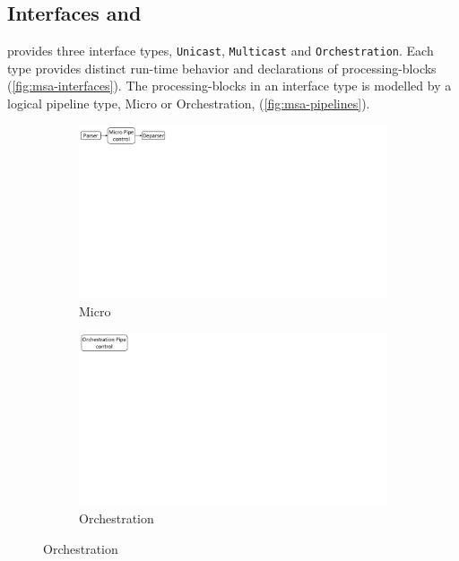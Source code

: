\documentclass[letterpaper,twocolumn,10pt]{article}
\begin{document}
\subsection{Interfaces and \upipelines}
\label{sec:pipelines}
\uarch provides three interface types, \texttt{Unicast}, 
\texttt{Multicast} and \texttt{Orchestration}.
Each type provides distinct run-time behavior and 
declarations of processing-blocks (\cref{fig:msa-interfaces}).
The processing-blocks in an interface type is modelled by a logical 
pipeline type, Micro or Orchestration, (\cref{fig:msa-pipelines}).
\begin{figure}[ht]
    \centering
    \begin{subfigure}{0.59\linewidth}
        \centering
        \includegraphics[trim=0 482 692 0, 
clip,scale=0.45]{msa-pipeline}
        \caption{Micro}
    \end{subfigure}\vline
    \begin{subfigure}{0.41\linewidth}
        \centering
        \includegraphics[trim=0 480 805 
0,clip,scale=0.45]{micro-orchestration-pipeline}
        \caption{Orchestration}

\end{subfigure}
\end{figure}
\end{document}
